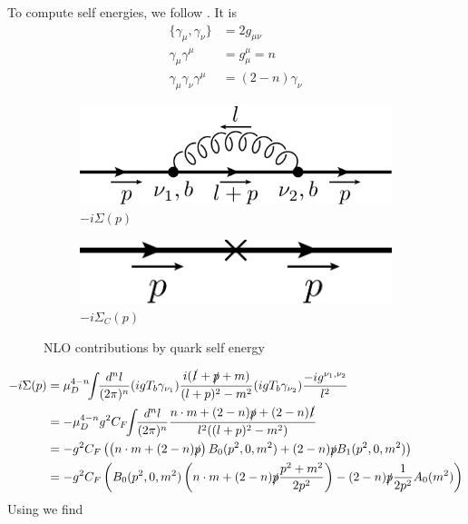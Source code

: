To compute self energies, we follow \cite{Bojak:2000eu}.
It is
\begin{align}
\{\gamma_\mu,\gamma_\nu\} &= 2g_{\mu\nu}\\
\gamma_\mu\gamma^\mu &= g_\mu^\mu = n \\
\gamma_\mu\gamma_\nu\gamma^\mu &= (2-n)\gamma_\nu
\end{align}
\begin{figure}[ht!]
	\begin{subfigure}[t]{.4\textwidth}
		\includegraphics[width=\textwidth]{pyfeyn/nlo-v-seq}
		\caption{$-i\Sigma(p)$}
	\end{subfigure}\hspace{.15\textwidth}%
	\begin{subfigure}[t]{.4\textwidth}
		\includegraphics[width=\textwidth]{pyfeyn/nlo-v-seqc}
		\caption{$-i\Sigma_C(p)$}
	\end{subfigure}
	\caption{NLO contributions by quark self energy}\label{fig:FeynNLOvseq}
\end{figure}
\begin{align}
-i\Sigma(p) &= \mu_D^{4-n}\!\!\int\!\!\frac{d^nl}{(2\pi)^n}(igT_b \gamma_{\nu_1})\frac{i(\slashed{l}+\slashed{p}+m)}{(l+p)^2-m^2}(igT_b \gamma_{\nu_2})\frac{-ig^{\nu_1,\nu_2}}{l^2}\\
 &=-\mu_D^{4-n}g^2C_F\!\!\int\!\!\frac{d^nl}{(2\pi)^n}\frac{n\cdot m+(2-n)\slashed{p}+(2-n)\slashed{l}}{l^2((l+p)^2-m^2)}\\
 &=-g^2C_F\left(\left(n\cdot m+(2-n)\slashed{p}\right)B_0(p^2,0,m^2)+(2-n)\slashed{p}B_1(p^2,0,m^2)\right)\\
 &=-g^2C_F\left(B_0(p^2,0,m^2)\left(n\cdot m+(2-n)\slashed{p}\frac{p^2+m^2}{2p^2}\right)-(2-n)\slashed{p}\frac 1{2p^2}A_0(m^2)\right)
\end{align}
Using \cite{Bojak:2000eu} we find
